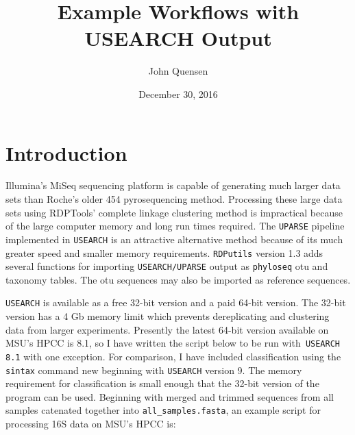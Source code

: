 \documentclass{article}
\title{Example Workflows with USEARCH Output}
\author{John Quensen}
\date{December 30, 2016}
\begin{document}


\maketitle

\section*{Introduction}

Illumina's MiSeq sequencing platform is capable of generating much larger data sets than Roche's older 454 pyrosequencing method. Processing these large data sets using RDPTools' complete linkage clustering method is impractical because of the large computer memory and long run times required.  The \texttt{UPARSE} pipeline implemented in \texttt{USEARCH} is an attractive alternative method because of its much greater speed and smaller memory requirements.  \texttt{RDPutils} version 1.3 adds several functions for importing \texttt{USEARCH/UPARSE} output as \texttt{phyloseq} otu and taxonomy tables. The otu sequences may also be imported as reference sequences.    

\texttt{USEARCH} is available as a free 32-bit version and a paid 64-bit version. The 32-bit version has a 4 Gb memory limit which prevents dereplicating and clustering data from larger experiments. Presently the latest 64-bit version available on MSU's HPCC is 8.1, so I have written the script below to be run with\texttt{ USEARCH 8.1} with one exception. For comparison, I have included classification using the \texttt{sintax} command new beginning with \texttt{USEARCH} version 9. The memory requirement for classification is small enough that the 32-bit version of the program can be used. 
Beginning with merged and trimmed sequences from all samples catenated together into 
\texttt{all\_samples.fasta}, an example script for processing 16S data on MSU's HPCC is:  
\end{document}

